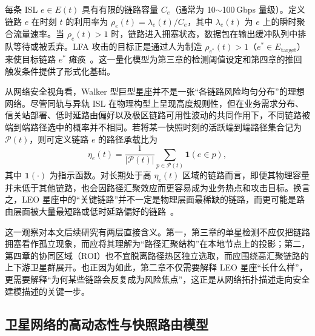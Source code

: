 每条 ISL $e \in E(t)$ 具有有限的链路容量 $C_e$（通常为 10$\sim$100\,Gbps 量级）。定义链路 $e$ 在时刻 $t$ 的利用率为 $\rho_e(t) = \lambda_e(t) / C_e$，其中 $\lambda_e(t)$ 为 $e$ 上的瞬时聚合流量速率。当 $\rho_e(t) > 1$ 时，链路进入拥塞状态，数据包在输出缓冲队列中排队等待或被丢弃。LFA 攻击的目标正是通过人为制造 $\rho_{e^*}(t) > 1$（$e^* \in E_{\text{target}}$）来使目标链路 $e^*$ 瘫痪~\cite{crossfire}。这一量化模型为第三章的检测阈值设定和第四章的推回触发条件提供了形式化基础。


从网络安全视角看，Walker 型巨型星座并不是一张“各链路风险均匀分布”的理想网络。尽管同轨与异轨 ISL 在物理构型上呈现高度规则性，但在业务需求分布、信关站部署、低时延路由偏好以及极区链路可用性波动的共同作用下，不同链路被端到端路径选中的概率并不相同。若将某一快照时刻的活跃端到端路径集合记为 $\mathcal{P}(t)$，则可定义链路 $e$ 的路径承载比为
\begin{equation}
    \eta_e(t)=\frac{1}{|\mathcal{P}(t)|}\sum_{p\in\mathcal{P}(t)} \mathbf{1}(e\in p),
\end{equation}
其中 $\mathbf{1}(\cdot)$ 为指示函数。对长期处于高 $\eta_e(t)$ 区域的链路而言，即便其物理容量并未低于其他链路，也会因路径汇聚效应而更容易成为业务热点和攻击目标。换言之，LEO 星座中的“关键链路”并不一定是物理层面最稀缺的链路，而更可能是路由层面被大量最短路或低时延路偏好的链路~\cite{handley2019delay, icarus, giuliari2020internet_backbones}。

这一观察对本文后续研究有两层直接含义。第一，第三章的单星检测不应仅把链路拥塞看作孤立现象，而应将其理解为“路径汇聚结构”在本地节点上的投影；第二，第四章的协同区域（ROI）也不宜脱离路径热区独立选取，而应围绕高汇聚链路的上下游卫星群展开。也正因为如此，第二章不仅需要解释 LEO 星座“长什么样”，更需要解释“为何某些链路会反复成为风险焦点”，这正是从网络拓扑描述走向安全建模描述的关键一步。


\subsection{卫星网络的高动态性与快照路由模型}

